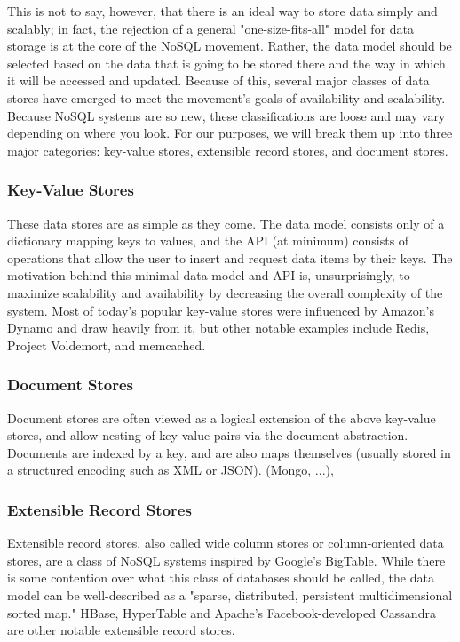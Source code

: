 \documentclass[11pt,a4paper]{report}
\begin{document}
This is not to say, however, that there is an ideal way to store data simply and scalably; in fact, the rejection of a general "one-size-fits-all" model for data storage is at the core of the NoSQL movement. Rather, the data model should be selected based on the data that is going to be stored there and the way in which it will be accessed and updated. Because of this, several major classes of data stores have emerged to meet the movement's goals of availability and scalability. Because NoSQL systems are so new, these classifications are loose and may vary depending on where you look. For our purposes, we will break them up into three major categories: key-value stores, extensible record stores, and document stores.

\subsubsection{Key-Value Stores}
These data stores are as simple as they come. The data model consists only of a dictionary mapping keys to values, and the API (at minimum) consists of operations that allow the user to insert and request data items by their keys.\cite{strauch2011nosql} The motivation behind this minimal data model and API is, unsurprisingly, to maximize scalability and availability by decreasing the overall complexity of the system. Most of today's popular key-value stores were influenced by Amazon's Dynamo and draw heavily from it, but other notable examples include Redis, Project Voldemort, and memcached. 
 
 
\subsubsection{Document Stores}
Document stores are often viewed as a logical extension of the above key-value stores, and allow nesting of key-value pairs via the document abstraction. Documents are indexed by a key, and are also maps themselves (usually stored in a structured encoding such as XML or JSON). (Mongo, ...),


 
\subsubsection{Extensible Record Stores}
Extensible record stores, also called wide column stores or column-oriented data stores, are a class of NoSQL systems inspired by Google's BigTable. While there is some contention over what this class of databases should be called, the data model can be well-described as a "sparse, distributed, persistent multidimensional sorted map."\cite{chang2008bigtable} HBase, HyperTable and Apache's Facebook-developed Cassandra are other notable extensible record stores.
\end{document}
